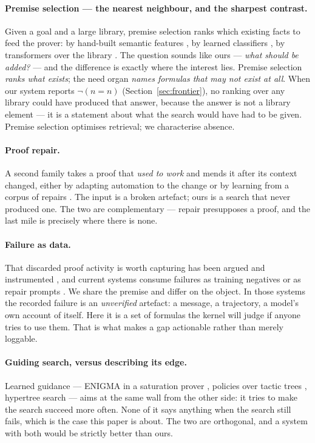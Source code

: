 \documentclass[11pt]{article}
\theoremstyle{remark}\newtheorem{remark}{Remark}
\begin{document}
\paragraph{Premise selection --- the nearest neighbour, and the sharpest contrast.} Given
a goal and a large library, premise selection ranks which existing facts to feed the
prover: by hand-built semantic features \cite{kaliszyk2015features}, by learned
classifiers \cite{alemi2016deepmath}, by transformers over the library
\cite{mikula2023magnushammer}. The question sounds like ours --- \emph{what should be
added?} --- and the difference is exactly where the interest lies. Premise selection
\emph{ranks what exists}; the need organ \emph{names formulas that may not exist at all}.
When our system reports $\neg(n = n)$ (Section~\ref{sec:frontier}), no ranking over any
library could have produced that answer, because the answer is not a library element ---
it is a statement about what the search would have had to be given. Premise selection
optimises retrieval; we characterise absence.

\paragraph{Proof repair.} A second family takes a proof that \emph{used to work} and
mends it after its context changed, either by adapting automation to the change
\cite{ringer2018pumpkin} or by learning from a corpus of repairs
\cite{reichel2023proofrepair,april2026}. The input is a broken artefact; ours is a search
that never produced one. The two are complementary --- repair presupposes a proof, and
the last mile is precisely where there is none.

\paragraph{Failure as data.} That discarded proof activity is worth capturing has been
argued and instrumented \cite{ringer2020replica}, and current systems consume failures as
training negatives or as repair prompts \cite{first2023baldur}. We share the premise and
differ on the object. In those systems the recorded failure is an \emph{unverified}
artefact: a message, a trajectory, a model's own account of itself. Here it is a set of
formulas the kernel will judge if anyone tries to use them. That is what makes a gap
actionable rather than merely loggable.

\paragraph{Guiding search, versus describing its edge.} Learned guidance --- ENIGMA in a
saturation prover \cite{jakubuv2020enigma}, policies over tactic trees
\cite{yang2019coqgym,polu2020gptf}, hypertree search \cite{lample2022htps} --- aims at
the same wall from the other side: it tries to make the search succeed more often. None
of it says anything when the search still fails, which is the case this paper is about.
The two are orthogonal, and a system with both would be strictly better than ours.
\end{document}
